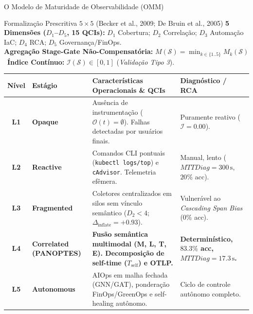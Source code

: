 \documentclass[aspectratio=169, 10pt]{beamer}
\begin{document}
\begin{frame}{O Modelo de Maturidade de Observabilidade (OMM)}
  \vspace{-0.8ex}
  \begin{block}{\footnotesize Formalização Prescritiva $5 \times 5$ (Becker et al., 2009; De Bruin et al., 2005)}
    \scriptsize
    \textbf{5 Dimensões ($D_1$--$D_5$, 15 QCIs):} $D_1$ Cobertura; $D_2$ Correlação; $D_3$ Automação IaC; $D_4$ RCA; $D_5$ Governança/FinOps.\\
    \textbf{Agregação Stage-Gate Não-Compensatória:} $M(\mathcal{S}) = \min_{k \in \{1..5\}} M_k(\mathcal{S})$ \quad \textbar\ \quad \textbf{Índice Contínuo:} $\mathcal{I}(\mathcal{S}) \in [0,1]$ (\textit{Validação Tipo 3}).
  \end{block}
  \vspace{-0.4ex}
  \footnotesize
  \begin{tabularx}{\textwidth}{c p{2.7cm} X p{3.3cm}}
    \toprule
    \textbf{Nível} & \textbf{Estágio} & \textbf{Características Operacionais \& QCIs} & \textbf{Diagnóstico / RCA} \\
    \midrule
    \textbf{L1} & \textbf{Opaque} & Ausência de instrumentação ($\mathcal{O}(t)=\emptyset$). Falhas detectadas por usuários finais. & Puramente reativo ($\mathcal{I}=0.00$). \\
    \addlinespace[2pt]
    \textbf{L2} & \textbf{Reactive} & Comandos CLI pontuais (\texttt{kubectl logs/top}) e \texttt{cAdvisor}. Telemetria efêmera. & Manual, lento ($MTTDiag = 300\,\text{s}$, $20\%$ acc). \\
    \addlinespace[2pt]
    \textbf{L3} & \textbf{Fragmented} & Coletores centralizados em silos sem vínculo semântico ($D_2 < 4$; $\Delta_{\text{inflate}}=+0.93$). & Vulnerável ao \textit{Cascading Span Bias} ($0\%$ acc). \\
    \addlinespace[2pt]
    \rowcolor{cinRed!12}
    \textbf{L4} & \textbf{Correlated (PANOPTES)} & \textbf{Fusão semântica multimodal (M, L, T, E). Decomposição de self-time ($T_{\text{self}}$) e OTLP.} & \textbf{Determinístico, $83.3\%$ acc, $MTTDiag = 17.3\,\text{s}$.} \\
    \addlinespace[2pt]
    \textbf{L5} & \textbf{Autonomous} & AIOps em malha fechada (GNN/GAT), ponderação FinOps/GreenOps e self-healing autônomo. & Ciclo de controle autônomo completo. \\
    \bottomrule
  \end{tabularx}
\end{frame}

\end{document}
